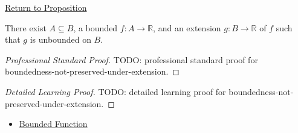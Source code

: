 \newpage
{}
\label{prf:boundedness-not-preserved-under-extension}

\begin{remark*}[Return]
\hyperref[prop:boundedness-not-preserved-under-extension]{Return to Proposition}
\end{remark*}

\begin{proposition*}
There exist \(A\subseteq B\), a bounded \(f:A\to\mathbb{R}\), and an
extension \(g:B\to\mathbb{R}\) of \(f\) such that \(g\) is unbounded on \(B\).
\end{proposition*}

\begin{proof}[Professional Standard Proof]
\LRAProofBodyStart
TODO: professional standard proof for boundedness-not-preserved-under-extension.
\end{proof}

\begin{proof}[Detailed Learning Proof]
\LRAProofBodyStart
TODO: detailed learning proof for boundedness-not-preserved-under-extension.
\end{proof}

\begin{remark*}
\end{remark*}

\begin{dependencies}
\begin{itemize}
  \item \hyperref[def:function-bounded]{Bounded Function}
\end{itemize}
\end{dependencies}

\clearpage
